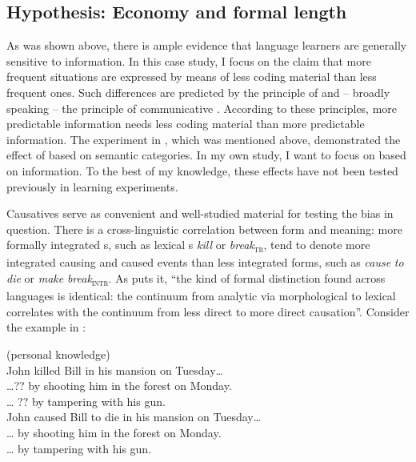 \documentclass[output=paper]{langsci/langscibook}
\begin{document}
\subsection{Hypothesis: Economy and formal length}

As was shown above, there is ample evidence that language learners are generally sensitive to  information. In this case study, I focus on the claim that more frequent situations are expressed by means of less coding material than less frequent ones. Such differences are predicted by the principle of  and – broadly speaking – the principle of communicative . According to these principles, more predictable information needs less coding material than more predictable information. The experiment in \citet{FedzechkinaEtAl2012}, which was mentioned above, demonstrated the effect of  based on semantic categories. In my own study, I want to focus on  based on  information. To the best of my knowledge, these effects have not been tested previously in  learning experiments. 

Causatives serve as convenient and well-studied material for testing the bias in question. There is a cross-linguistic correlation between form and meaning: more formally integrated s, such as lexical s \textit{kill} or \textit{break}\textsc{\textsubscript{tr}}, tend to denote more integrated causing and caused events than less integrated forms, such as \textit{cause} \textit{to} \textit{die} or \textit{make} \textit{break}\textsc{\textsubscript{intr}}. As \citet[165]{Comrie1981} puts it, “the kind of formal distinction found across languages is identical: the continuum from analytic via morphological to lexical  correlates with the continuum from less direct to more direct causation”. Consider the example in :

\ea\label{ex:levshina:1}
{ (personal knowledge)}\\ 
  \ea John killed Bill in his mansion on Tuesday… \\
    \ea …?? by shooting him in the forest on Monday.\\
    \ex … ?? by tampering with his gun.\\
    \z
  \ex  John caused Bill to die in his mansion on Tuesday…\\
    \ea … by shooting him in the forest on Monday.\\
    \ex … by tampering with his gun.\\
    \z
  \z
\z
\end{document}
